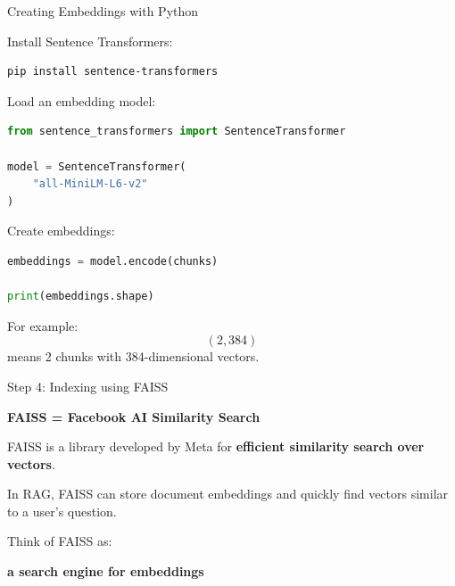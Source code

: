 \documentclass[aspectratio=169]{beamer}
\begin{document}
\begin{frame}{Creating Embeddings with Python}

Install Sentence Transformers:

\begin{lstlisting}[language=bash]
pip install sentence-transformers
\end{lstlisting}

Load an embedding model:

\begin{lstlisting}[language=Python]
from sentence_transformers import SentenceTransformer

model = SentenceTransformer(
    "all-MiniLM-L6-v2"
)
\end{lstlisting}

Create embeddings:

\begin{lstlisting}[language=Python]
embeddings = model.encode(chunks)

print(embeddings.shape)
\end{lstlisting}

For example:
\[
(2,384)
\]
means 2 chunks with 384-dimensional vectors.

\end{frame}

\begin{frame}{Step 4: Indexing using FAISS}

\textbf{FAISS = Facebook AI Similarity Search}

FAISS is a library developed by Meta for
\textbf{efficient similarity search over vectors}.

In RAG, FAISS can store document embeddings and
quickly find vectors similar to a user's question.

\vspace{0.4cm}

Think of FAISS as:

\begin{center}
\Large
\textbf{a search engine for embeddings}
\end{center}

\end{frame}
\end{document}
